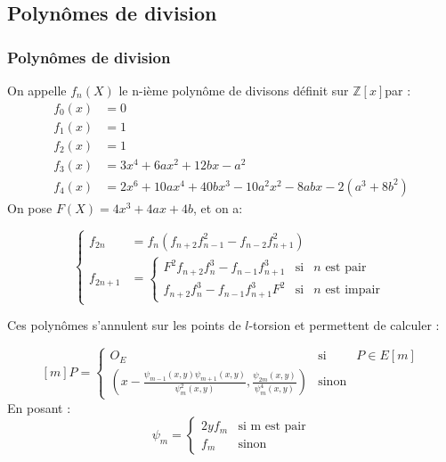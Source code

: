 \documentclass{beamer}
\begin{document}
\subsection{Polynômes de division}
\begin{frame}
\frametitle{Polynômes de division}
On appelle $f_n(X)$ le n-ième polynôme de divisons définit sur $\mathbb{Z}[x]$par : 
\begin{align*}
f_0(x) &= 0 \\
f_1(x) &= 1 \\
f_2(x) &= 1 \\
f_3(x) &= 3x^4 + 6ax^2 +12bx - a^2 \\
f_4(x) &= 2x^6 + 10ax^4 +40bx^3 - 10a^2x^2 - 8abx - 2(a^3 + 8b^2)
\end{align*}
On pose $F(X)= 4x^3 + 4ax + 4b$, et on a:

\begin{equation}
\left\lbrace
\begin{array}{ll}
f_{2n}& =  f_n(f_{n+2}f_{n-1}^2 - f_{n-2}f_{n+1}^2)   \\
f_{2n+1}& = \left\lbrace 
\begin{array}{ccc}
F^2f_{n+2}f_n^3 - f_{n-1}f_{n+1}^3 & \mbox{si} & n \text{ est pair}\\
f_{n+2}f_n^3 - f_{n-1}f_{n+1}^3F^2 & \mbox{si} & n \text{ est impair} \end{array}\right.

\end{array} \right.
\end{equation} 
\end{frame}

\begin{frame}
Ces polynômes s'annulent sur les points de $l$-torsion et permettent de calculer :

\begin{equation}\label{mP}
[m]P = \left\lbrace
\begin{array}{lll}
O_E & \mbox{si} & P \in E[m]  \\
\left(  x -   \frac{\psi_{m-1}(x,y)\psi_{m+1}(x,y)}{\psi^2_m(x,y)}, \frac{\psi_{2m}(x,y)}{\psi^4_m(x,y)}\right) & \mbox{sinon}  & 
\end{array}\right.
\end{equation}
En posant : 
\begin{equation*}
\psi_m= \left\lbrace
\begin{array}{cc}
2yf_m & \mbox{si m est pair} \\
f_m & \mbox{sinon}
\end{array}\right.
\end{equation*} 
\end{frame}
\end{document}
